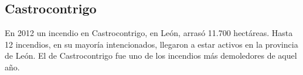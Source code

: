 \subsection{Castrocontrigo}
En 2012 un incendio en Castrocontrigo, en León, arrasó 11.700 hectáreas. Hasta 12 incendios, en su mayoría intencionados, llegaron a estar activos en la provincia de León. El de Castrocontrigo fue uno de los incendios más demoledores de aquel año. 
